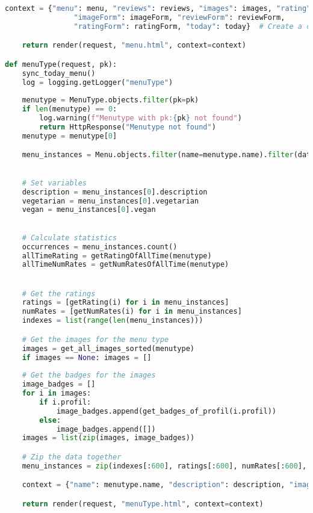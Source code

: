 \begin{lstlisting}[language=Python]
    context = {"menu": menu, "reviews": reviews, "images": images, "rating": rating, "numRates": numRates,
                "imageForm": imageForm, "reviewForm": reviewForm,
                "ratingForm": ratingForm, "today": today}  # Create a context dictionary to pass to the template

    return render(request, "menu.html", context=context)

def menuType(request, pk):
    sync_today_menu()
    log = logging.getLogger("menuType")
    
    menutype = MenuType.objects.filter(pk=pk)
    if len(menutype) == 0:
        log.warning(f"Menutype with pk:{pk} not found")
        return HttpResponse("Menutype not found")
    menutype = menutype[0]

    menu_instances = Menu.objects.filter(name=menutype.name).filter(date__lte=dt.date.today()).order_by("-date")
    

    # Set variables
    description = menu_instances[0].description
    vegetarian = menu_instances[0].vegetarian
    vegan = menu_instances[0].vegan

    
    # Calculate statistics
    occurrences = menu_instances.count()
    allTimeRating = getRatingOfAllTime(menutype)
    allTimeNumRates = getNumRatesOfAllTime(menutype)


    # Get the ratings
    ratings = [getRating(i) for i in menu_instances]
    numRates = [getNumRates(i) for i in menu_instances]
    indexes = list(range(len(menu_instances)))

    # Get the images for the menu type
    images = get_all_images_sorted(menutype)
    if images == None: images = []
    
    # Get the badges for the images
    image_badges = []
    for i in images:
        if i.profil:
            image_badges.append(get_badges_of_profil(i.profil))
        else:
            image_badges.append([])
    images = list(zip(images, image_badges))

    # Zip the data together
    menu_instances = zip(indexes[:600], ratings[:600], numRates[:600], menu_instances[:600])

    context = {"name": menutype.name, "description": description, "images": images, "vegetarian": vegetarian, "vegan": vegan, "menu_instances": menu_instances, "occurrences": occurrences, "allTimeRating": allTimeRating, "allTimeNumRates": allTimeNumRates}

    return render(request, "menuType.html", context=context)





\end{lstlisting}

